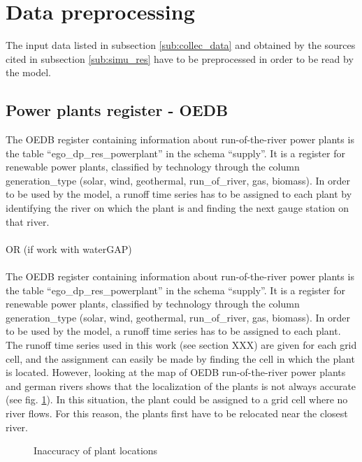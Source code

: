 \section{Data preprocessing}

The input data listed in subsection \ref{sub:collec_data} and obtained by the sources cited in subsection \ref{sub:simu_res} have to be preprocessed in order to be read by the model.

\subsection{Power plants register - OEDB}

The OEDB register containing information about run-of-the-river power plants is the table ``ego{\_}dp{\_}res{\_}powerplant'' in the schema ``supply''. It is a register for renewable power plants, classified by technology through the column generation{\_}type (solar, wind, geothermal, run{\_}of{\_}river, gas, biomass). In order to be used by the model, a runoff time series has to be assigned to each plant by identifying the river on which the plant is and finding the next gauge station on that river.
\\ \\
OR (if work with waterGAP)
\\ \\
The OEDB register containing information about run-of-the-river power plants is the table ``ego{\_}dp{\_}res{\_}powerplant'' in the schema ``supply''. It is a register for renewable power plants, classified by technology through the column generation{\_}type (solar, wind, geothermal, run{\_}of{\_}river, gas, biomass). \newline In order to be used by the model, a runoff time series has to be assigned to each plant. The runoff time series used in this work (see section XXX) are given for each grid cell, and the assignment can easily be made by finding the cell in which the plant is located. However, looking at the map of OEDB run-of-the-river power plants and german rivers shows that the localization of the plants is not always accurate (see fig. \ref{pp_river_dist}). In this situation, the plant could  be assigned to a grid cell where no river flows. For this reason, the plants first have to be relocated near the closest river. 
\begin{figure}[H]
\center
{}
\caption{Inaccuracy of plant locations}
\label{pp_river_dist}
\end{figure}

